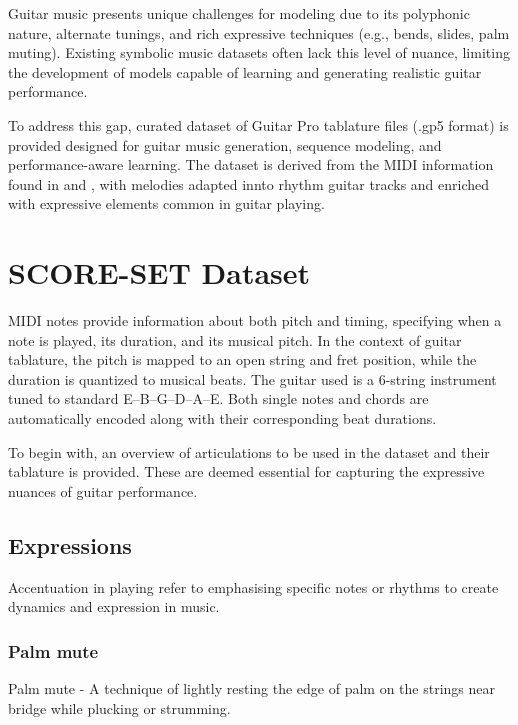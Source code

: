 \documentclass[twoside,11pt]{article}
\begin{document}
Guitar music presents unique challenges for 
modeling due to its polyphonic nature, alternate tunings, and rich 
expressive techniques (e.g., bends, slides, palm muting). Existing symbolic 
music datasets often lack this level of nuance, limiting the development of 
models capable of learning and generating realistic guitar performance.

To address this gap, curated dataset of Guitar Pro tablature files (.gp5 format) is provided 
designed for guitar music generation, sequence modeling, and performance-aware learning. 
The dataset is derived from the MIDI information found in \cite{hawthorne2018enabling} and 
\cite{kong2022giantmidipianolargescalemididataset}, with melodies adapted innto 
rhythm guitar tracks and enriched with expressive elements common in guitar playing.
\section{SCORE-SET Dataset}
MIDI notes provide information about both pitch and timing, specifying when 
a note is played, its duration, and its musical pitch. 
In the context of guitar tablature, the pitch is mapped to an open string and 
fret position, while the duration is quantized to musical beats. The guitar used is a 6-string instrument tuned to standard E--B--G--D--A--E. 
Both single notes and chords are automatically encoded along with their corresponding beat durations.

To begin with, an overview of articulations to be used in 
the dataset and their tablature is provided. These are deemed essential for capturing the expressive nuances of 
guitar performance.
\subsection{Expressions}
Accentuation in playing refer to emphasising specific notes or rhythms to create dynamics and expression in music. 
\subsubsection{Palm mute}
Palm mute - A technique of lightly resting the edge of palm on the strings near bridge while plucking or strumming.
\end{document}
